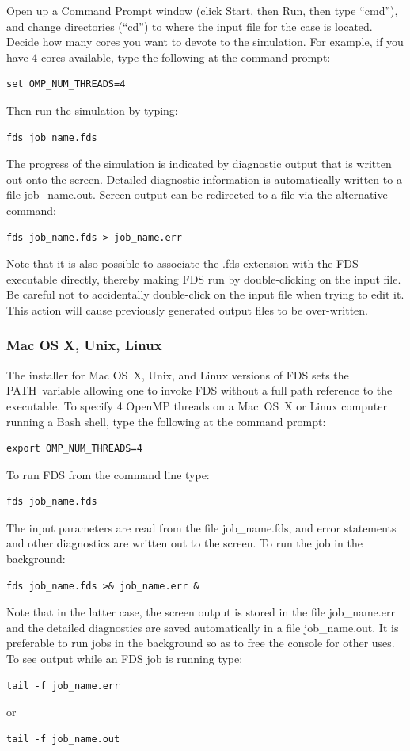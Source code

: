 \documentclass[11pt]{book}
\begin{document}
Open up a Command Prompt window (click Start, then Run, then type ``cmd''), and change directories (``cd'') to where the input file for the case is located. Decide how many cores you want to devote to the simulation. For example, if you have 4 cores available, type the following at the command prompt:
\begin{lstlisting}
set OMP_NUM_THREADS=4
\end{lstlisting}
Then run the simulation by typing:
\begin{lstlisting}
fds job_name.fds
\end{lstlisting}
The progress of the simulation is indicated by diagnostic output that is written out onto the screen. Detailed diagnostic information is automatically written to a file {\ct job\_name.out}. Screen output can be redirected to a file via the alternative command:
\begin{lstlisting}
fds job_name.fds > job_name.err
\end{lstlisting}
Note that it is also possible to associate the {\ct .fds} extension with the FDS executable directly, thereby making FDS run by double-clicking on the input file. Be careful not to accidentally double-click on the input file when trying to edit it. This action will cause previously generated output files to be over-written.

\subsubsection{Mac OS X, Unix, Linux}

The installer for Mac OS~X, Unix, and Linux versions of FDS sets the {\ct PATH}\ variable allowing one to invoke FDS without a full path reference to the executable.  To specify 4 OpenMP threads on a Mac~OS~X or Linux computer running a Bash shell, type the following at the command prompt:
\begin{lstlisting}
export OMP_NUM_THREADS=4
\end{lstlisting}
To run FDS from the command line type:
\begin{lstlisting}
fds job_name.fds
\end{lstlisting}
The input parameters are read from the file {\ct job\_name.fds}, and error statements and other diagnostics are written out to the screen. To run the job in the background:
\begin{lstlisting}
fds job_name.fds >& job_name.err &
\end{lstlisting}
Note that in the latter case, the screen output is stored in the file {\ct job\_name.err} and the detailed diagnostics are saved automatically in a file {\ct job\_name.out}. It is preferable to run jobs in the background so as to free the console for other uses. To see output while an
FDS job is running type:
\begin{lstlisting}
tail -f job_name.err
\end{lstlisting}
or
\begin{lstlisting}
tail -f job_name.out
\end{lstlisting}
\end{document}
